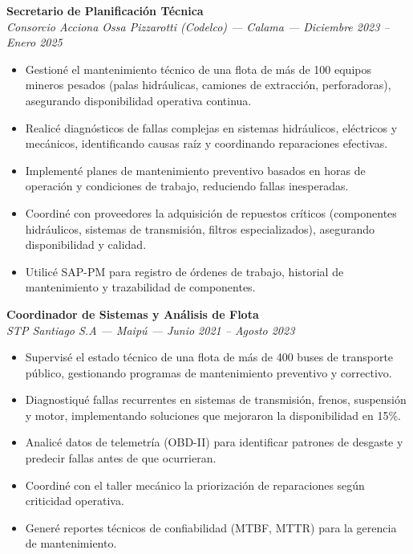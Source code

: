 \documentclass[10pt,letterpaper]{article}
\begin{document}
\noindent \textbf{Secretario de Planificación Técnica} \\
\textit{Consorcio Acciona Ossa Pizzarotti (Codelco) — Calama — Diciembre 2023 – Enero 2025}
\begin{itemize}
    \item Gestioné el mantenimiento técnico de una flota de más de 100 equipos mineros pesados (palas hidráulicas, camiones de extracción, perforadoras), asegurando disponibilidad operativa continua.
    \item Realicé diagnósticos de fallas complejas en sistemas hidráulicos, eléctricos y mecánicos, identificando causas raíz y coordinando reparaciones efectivas.
    \item Implementé planes de mantenimiento preventivo basados en horas de operación y condiciones de trabajo, reduciendo fallas inesperadas.
    \item Coordiné con proveedores la adquisición de repuestos críticos (componentes hidráulicos, sistemas de transmisión, filtros especializados), asegurando disponibilidad y calidad.
    \item Utilicé SAP-PM para registro de órdenes de trabajo, historial de mantenimiento y trazabilidad de componentes.
\end{itemize}

\vspace{0.2cm}

\noindent \textbf{Coordinador de Sistemas y Análisis de Flota} \\
\textit{STP Santiago S.A — Maipú — Junio 2021 – Agosto 2023}
\begin{itemize}
    \item Supervisé el estado técnico de una flota de más de 400 buses de transporte público, gestionando programas de mantenimiento preventivo y correctivo.
    \item Diagnostiqué fallas recurrentes en sistemas de transmisión, frenos, suspensión y motor, implementando soluciones que mejoraron la disponibilidad en 15\%.
    \item Analicé datos de telemetría (OBD-II) para identificar patrones de desgaste y predecir fallas antes de que ocurrieran.
    \item Coordiné con el taller mecánico la priorización de reparaciones según criticidad operativa.
    \item Generé reportes técnicos de confiabilidad (MTBF, MTTR) para la gerencia de mantenimiento.
\end{itemize}
\end{document}
